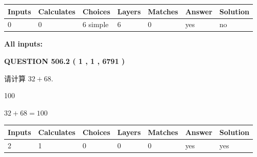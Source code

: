 \documentclass{ctexart}
\begin{document}
   
\noindent\begin{tabular}{|l|l|l|l|l|l|l|}
 \hline
Inputs & Calculates & Choices & Layers & Matches & Answer & Solution \\ \hline
 0  & 
 0  & 
 6
  simple  
  & 
 6  & 
 0  & 
  yes & 
  no 
  \\ \hline
 \end{tabular}
   
   
   
   
\noindent{}
   
   
   
   
\noindent\vspace{0.1in}\hspace{-0.08in} {\textbf{\Large{All inputs: }}}
   
   
  
\vspace{0.2in}
  
{\textbf{\Large{QUESTION
506.2 
 ( 1 , 1 , 6791 )
}}}
  
  
 
请计算 $ %
32 +  %
68 $.
 
 
 
\noindent{}
 
 

100
 
 
\noindent{}
 
 

 
 
 
\noindent{}
 
 

$ %
32 +  %
68=   %
100$
 
 
\noindent{}
 
 

 
   
   
   
   
\noindent\begin{tabular}{|l|l|l|l|l|l|l|}
 \hline
Inputs & Calculates & Choices & Layers & Matches & Answer & Solution \\ \hline
 2  & 
 1  & 
 0
  & 
 0  & 
 0  & 
  yes & 
  yes 
  \\ \hline
 \end{tabular}
   
\end{document}
